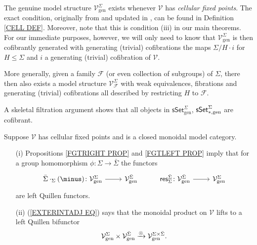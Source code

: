 \documentclass[a4paper,10pt]{article}%
\begin{document}
\begin{remark}\label{GENCOFGEN REM}
The genuine model structure
$\mathcal{V}^{\Sigma}_{\text{gen}}$
exists whenever $\mathcal{V}$ has
\textit{cellular fixed points}.
The exact condition, originally from \cite{Gui06} and updated in \cite{Ste16}, can be found in Definition \ref{CELL DEF}. Moreover, note that this is condition (iii) in our main theorems.
For our immediate purposes, however, we will only need to know that 
$\mathcal{V}^{\Sigma}_{\text{gen}}$
is then cofibrantly generated with 
generating (trivial) cofibrations the maps
$\Sigma/H \cdot i$
for $H\leq \Sigma$
and $i$ a generating (trivial) cofibration of $\mathcal{V}$.

More generally, given a family $\mathcal{F}$ (or even collection of subgroups) of $\Sigma$, there then also exists a model structure 
$\mathcal{V}^{\Sigma}_{\mathcal{F}}$ with weak equivalences, fibrations and generating (trivial) cofibrations all described by restricting $H$ to 
$\mathcal{F}$.
\end{remark}

\begin{remark}\label{ALLCOF REM}
A skeletal filtration argument shows that all objects in 
$\mathsf{sSet}^{\Sigma}_{\text{gen}}$,
$\mathsf{sSet}^{\Sigma}_{\**,\text{gen}}$
are cofibrant.
\end{remark}


\begin{remark}\label{GEN_FGTRIGHT_REM}
Suppose $\mathcal{V}$ has cellular fixed points and is a closed monoidal model category.
\begin{itemize}
	\item [(i)] Propositions \ref{FGTRIGHT PROP} and
	\ref{FGTLEFT PROP} imply that for a group homomorphism 
$\phi: \Sigma \to \bar \Sigma$ 
the functors
\[
\begin{tikzcd}
	\bar{\Sigma} \cdot_{\Sigma} (\minus)
		\colon
	\mathcal{V}_{\text{gen}}^{\Sigma}
	\ar{r}
&
	\mathcal{V}_{\text{gen}}^{\bar{\Sigma}}
&
	\mathsf{res}^{\bar{\Sigma}}_{\Sigma}
		\colon
	\mathcal{V}_{\text{gen}}^{\bar{\Sigma}}
	\ar{r}
&
	\mathcal{V}_{\text{gen}}^{\Sigma}
\end{tikzcd}
\]
	are left Quillen functors. 
	\item[(ii)] (\ref{EXTERINTADJ EQ}) says that the monoidal product on $\mathcal{V}$ lifts to a left Quillen bifunctor
	\[
	\mathcal V^{\Sigma}_{\text{gen}} \times \mathcal V^{\bar \Sigma}_{\text{gen}} 
	\xrightarrow{\otimes}
	\mathcal V^{\Sigma \times \bar \Sigma}_{\text{gen}}.
	\]
\end{itemize}
\end{remark} 
\end{document}
